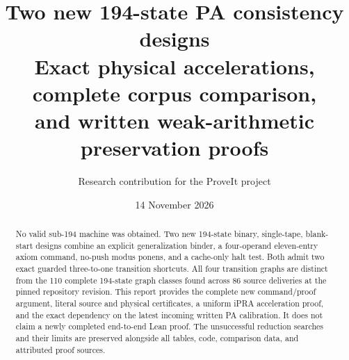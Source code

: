 \documentclass[10pt,a4paper]{article}
\title{Two new 194-state PA consistency designs\\[4pt]
\large Exact physical accelerations, complete corpus comparison,\\
and written weak-arithmetic preservation proofs}
\author{Research contribution for the ProveIt project}
\date{14 November 2026}
\begin{document}
\maketitle
\begin{abstract}
No valid sub-194 machine was obtained. Two new 194-state binary,
single-tape, blank-start designs combine an explicit generalization
binder, a four-operand eleven-entry axiom command, no-push modus
ponens, and a cache-only halt test. Both admit two exact guarded
three-to-one transition shortcuts. All four transition graphs are
distinct from the 110 complete 194-state graph classes found across
86 source deliveries at the pinned repository revision. This report
provides the complete new command/proof argument, literal source
and physical certificates, a uniform iPRA acceleration proof,
and the exact dependency on the latest incoming written PA calibration.
It does not claim a newly completed end-to-end Lean proof.
The unsuccessful reduction searches and their limits are preserved
alongside all tables, code, comparison data, and attributed proof sources.
\end{abstract}
\clearpage
\tableofcontents
\clearpage

\clearpage

\clearpage

\clearpage
\appendix



\clearpage

\end{document}
